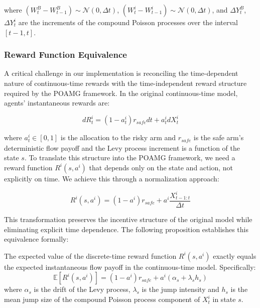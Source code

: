 where $(W^B_t - W^B_{t-1}) \sim \mathcal{N}(0, \Delta t)$, $(W^i_t - W^i_{t-1}) \sim \mathcal{N}(0, \Delta t)$, and $\Delta Y^B_t$, $\Delta Y^i_t$ are the increments of the compound Poisson processes over the interval $[t-1, t]$.

\subsubsection{Reward Function Equivalence}
\label{appendix:reward_equivalence}

A critical challenge in our implementation is reconciling the time-dependent nature of continuous-time rewards with the time-independent reward structure required by the POAMG framework. In the original continuous-time model, agents' instantaneous rewards are:

\begin{equation}
    dR^i_t = (1-a^i_t)r_\textit{safe} dt + a^i_t dX^i_t
\end{equation}

where $a^i_t \in [0,1]$ is the allocation to the risky arm and $r_\textit{safe}$ is the safe arm's deterministic flow payoff and the Levy process increment is a function of the state $s$. To translate this structure into the POAMG framework, we need a reward function $R^i(s, a^i)$ that depends only on the state and action, not explicitly on time. We achieve this through a normalization approach:

\begin{equation}
    R^i(s, a^i) = (1-a^i)r_\textit{safe} + a^i \frac{X^i_{t-1:t}}{\Delta t}
\end{equation}

This transformation preserves the incentive structure of the original model while eliminating explicit time dependence. The following proposition establishes this equivalence formally:

\begin{proposition}
    The expected value of the discrete-time reward function $R^i(s, a^i)$ exactly equals the expected instantaneous flow payoff in the continuous-time model. Specifically:
    \begin{equation}
        \mathbb{E}[R^i(s, a^i)] = (1-a^i)r_\textit{safe} + a^i(\alpha_s + \lambda_s h_s)
    \end{equation}
    where $\alpha_s$ is the drift of the Levy process, $\lambda_s$ is the jump intensity and $h_s$ is the mean jump size of the compound Poisson process component of $X^i_t$ in state $s$.
\end{proposition}

